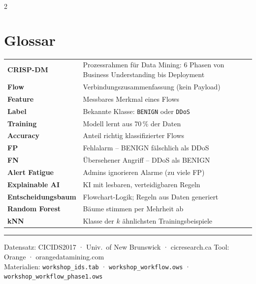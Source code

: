 \documentclass[a4paper, 10pt]{article}
\begin{document}
\begin{multicols}{2}
\section*{Glossar}

{\small
\begin{tabularx}{\linewidth}{@{}l>{\raggedright\arraybackslash}X@{}}
\textbf{CRISP-DM}    & Prozessrahmen für Data Mining: 6 Phasen von Business Understanding bis Deployment \\
\textbf{Flow}        & Verbindungszusammenfassung (kein Payload) \\
\textbf{Feature}     & Messbares Merkmal eines Flows \\
\textbf{Label}       & Bekannte Klasse: \texttt{BENIGN} oder \texttt{DDoS} \\
\textbf{Training}    & Modell lernt aus 70\,\% der Daten \\
\textbf{Accuracy}    & Anteil richtig klassifizierter Flows \\
\textbf{FP}          & Fehlalarm – BENIGN fälschlich als DDoS \\
\textbf{FN}          & Übersehener Angriff – DDoS als BENIGN \\
\textbf{Alert Fatigue} & Admins ignorieren Alarme (zu viele FP) \\
\textbf{Explainable AI} & KI mit lesbaren, verteidigbaren Regeln \\
\textbf{Entscheidungsbaum} & Flowchart-Logik; Regeln aus Daten generiert \\
\textbf{Random Forest} & 100 Bäume stimmen per Mehrheit ab \\
\textbf{kNN} & Klasse der $k$ ähnlichsten Trainingsbeispiele \\
\end{tabularx}
}

\vfill

\rule{\linewidth}{0.4pt}
{\footnotesize\sffamily\color{dunkelgrau}%
  Datensatz: CICIDS2017 · Univ.\ of New Brunswick · cicresearch.ca\quad
  Tool: Orange · orangedatamining.com\\
  Materialien: \texttt{workshop\_ids.tab} · \texttt{workshop\_workflow.ows}
  · \texttt{workshop\_workflow\_phase1.ows}
}

\end{multicols}
\end{document}
